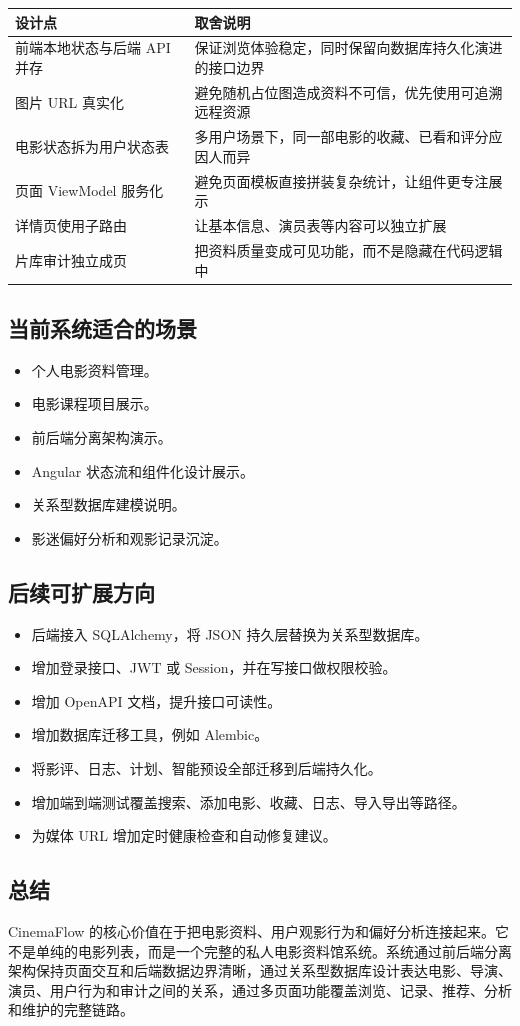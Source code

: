 \documentclass[
]{ctexart}
\providecommand{\tightlist}{%
  \setlength{\itemsep}{0pt}\setlength{\parskip}{0pt}}
\begin{document}
\begin{longtable}[]{@{}ll@{}}
\toprule
设计点 & 取舍说明 \\
\midrule
\endhead
前端本地状态与后端 API 并存 &
保证浏览体验稳定，同时保留向数据库持久化演进的接口边界 \\
图片 URL 真实化 &
避免随机占位图造成资料不可信，优先使用可追溯远程资源 \\
电影状态拆为用户状态表 &
多用户场景下，同一部电影的收藏、已看和评分应因人而异 \\
页面 ViewModel 服务化 &
避免页面模板直接拼装复杂统计，让组件更专注展示 \\
详情页使用子路由 & 让基本信息、演员表等内容可以独立扩展 \\
片库审计独立成页 & 把资料质量变成可见功能，而不是隐藏在代码逻辑中 \\
\bottomrule
\end{longtable}

\hypertarget{ux5f53ux524dux7cfbux7edfux9002ux5408ux7684ux573aux666f}{%
\subsection{当前系统适合的场景}\label{ux5f53ux524dux7cfbux7edfux9002ux5408ux7684ux573aux666f}}

\begin{itemize}
\tightlist
\item
  个人电影资料管理。
\item
  电影课程项目展示。
\item
  前后端分离架构演示。
\item
  Angular 状态流和组件化设计展示。
\item
  关系型数据库建模说明。
\item
  影迷偏好分析和观影记录沉淀。
\end{itemize}

\hypertarget{ux540eux7eedux53efux6269ux5c55ux65b9ux5411}{%
\subsection{后续可扩展方向}\label{ux540eux7eedux53efux6269ux5c55ux65b9ux5411}}

\begin{itemize}
\tightlist
\item
  后端接入 SQLAlchemy，将 JSON 持久层替换为关系型数据库。
\item
  增加登录接口、JWT 或 Session，并在写接口做权限校验。
\item
  增加 OpenAPI 文档，提升接口可读性。
\item
  增加数据库迁移工具，例如 Alembic。
\item
  将影评、日志、计划、智能预设全部迁移到后端持久化。
\item
  增加端到端测试覆盖搜索、添加电影、收藏、日志、导入导出等路径。
\item
  为媒体 URL 增加定时健康检查和自动修复建议。
\end{itemize}

\hypertarget{ux603bux7ed3}{%
\subsection{总结}\label{ux603bux7ed3}}

CinemaFlow
的核心价值在于把电影资料、用户观影行为和偏好分析连接起来。它不是单纯的电影列表，而是一个完整的私人电影资料馆系统。系统通过前后端分离架构保持页面交互和后端数据边界清晰，通过关系型数据库设计表达电影、导演、演员、用户行为和审计之间的关系，通过多页面功能覆盖浏览、记录、推荐、分析和维护的完整链路。
\end{document}
